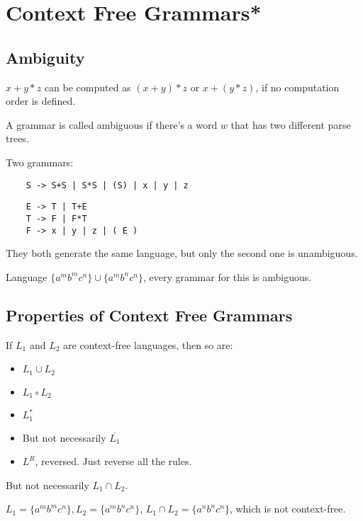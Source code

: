 \section{Context Free Grammars*}

\subsection{Ambiguity}

$x+y*z$ can be computed as $(x+y)*z$ or $x+(y*z)$, if no computation order is defined.

A grammar is called ambiguous if there's a word $w$ that has two
different parse trees.

\begin{example}
Two grammars:

\begin{verbatim}
    S -> S+S | S*S | (S) | x | y | z
\end{verbatim}

\begin{verbatim}
    E -> T | T+E
    T -> F | F*T
    F -> x | y | z | ( E )
\end{verbatim}

They both generate the same language, but only the second one is
unambiguous.
\end{example}

\begin{example}
Language \(\{a^mb^mc^n\} \cup \{a^mb^nc^n\}\), every grammar for this is
ambiguous.
\end{example}


\subsection{Properties of Context Free Grammars}

If \(L_1\) and \(L_2\) are context-free languages,
then so are:

\begin{itemize}
\item
  \(L_1 \cup L_2\)
\item
  \(L_1 \circ L_2\)
\item
  \(L_1^*\)
\item
  But not necessarily \(\overline{L_1}\)
\item
  \(L^R\), reversed. Just reverse all the rules.
\end{itemize}

But not necessarily \(L_1 \cap L_2\).

\begin{observation}
\(L_1 = \{a^mb^mc^n\}, L_2 = \{a^mb^nc^n\}\),
  \(L_1\cap L_2 = \{a^nb^nc^n\}\), which is not context-free.
\end{observation}
  
